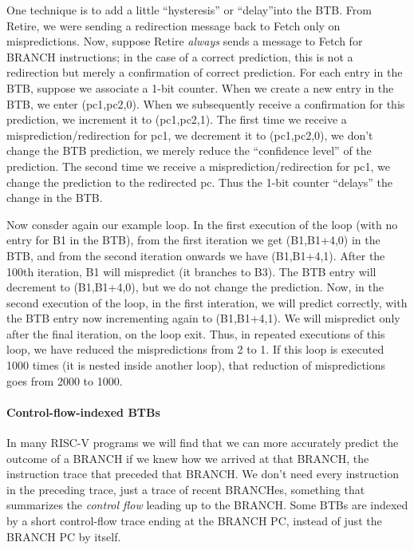 One technique is to add a little ``hysteresis'' or ``delay''into the
BTB.  From Retire, we were sending a redirection message back to Fetch
only on mispredictions.  Now, suppose Retire \emph{always} sends a
message to Fetch for BRANCH instructions; in the case of a correct
prediction, this is not a redirection but merely a confirmation of
correct prediction.  For each entry in the BTB, suppose we associate a
1-bit counter.  When we create a new entry in the BTB, we enter
(pc1,pc2,0).  When we subsequently receive a confirmation for this
prediction, we increment it to (pc1,pc2,1).  The first time we receive
a misprediction/redirection for pc1, we decrement it to (pc1,pc2,0),
{\ie} we don't change the BTB prediction, we merely reduce the
``confidence level'' of the prediction.  The second time we receive a
misprediction/redirection for pc1, we change the prediction to the
redirected pc.  Thus the 1-bit counter ``delays'' the change in the
BTB.

Now consder again our example loop.  In the first execution of the
loop (with no entry for B1 in the BTB), from the first iteration we
get (B1,B1+4,0) in the BTB, and from the second iteration onwards we
have (B1,B1+4,1). After the 100th iteration, B1 will mispredict (it
branches to B3).  The BTB entry will decrement to (B1,B1+4,0), but we
do not change the prediction.  Now, in the second execution of the
loop, in the first interation, we will predict correctly, with the BTB
entry now incrementing again to (B1,B1+4,1).  We will mispredict only
after the final iteration, on the loop exit.  Thus, in repeated
executions of this loop, we have reduced the mispredictions from 2 to
1.  If this loop is executed 1000 times (it is nested inside another
loop), that reduction of mispredictions goes from 2000 to 1000.


\paragraph{Control-flow-indexed BTBs}

\label{Sec_BTBs_w_cf_index}


In many RISC-V programs we will find that we can more accurately
predict the outcome of a BRANCH if we knew how we arrived at that
BRANCH, {\ie} the instruction trace that preceded that BRANCH.  We
don't need every instruction in the preceding trace, just a trace of
recent BRANCHes, {\ie} something that summarizes the \emph{control
flow} leading up to the BRANCH.  Some BTBs are indexed by a short
control-flow trace ending at the BRANCH PC, instead of just the BRANCH
PC by itself.

